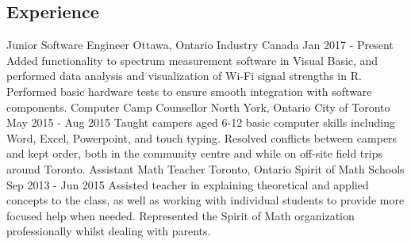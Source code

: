 \documentclass[]{aanguyen_cv}
\begin{document}
	\begin{main}%
		\vspace{35pt}%
		\section{Experience}
			\mainentry%
				{Junior Software Engineer}%
				{Ottawa, Ontario}%
				{Industry Canada}%
				{Jan 2017 - Present}%
				{Added functionality to spectrum measurement software in Visual Basic, and performed data analysis and visualization of Wi-Fi signal strengths in R. Performed basic hardware tests to ensure smooth integration with software components.}
			\mainentry%
				{Computer Camp Counsellor}%
				{North York, Ontario}%
				{City of Toronto}%
				{May 2015 - Aug 2015}%
				{Taught campers aged 6-12 basic computer skills including Word, Excel, Powerpoint, and touch typing. Resolved conflicts between campers and kept order, both in the community centre and while on off-site field trips around Toronto.}
			\mainentry%
				{Assistant Math Teacher}%
				{Toronto, Ontario}%
				{Spirit of Math Schools}%
				{Sep 2013 - Jun 2015}%
				{Assisted teacher in explaining theoretical and applied concepts to the class, as well as working with individual students to provide more focused help when needed. Represented the Spirit of Math organization professionally whilst dealing with parents.}
			\vspace{0.65cm}%

\end{main}
\end{document}
